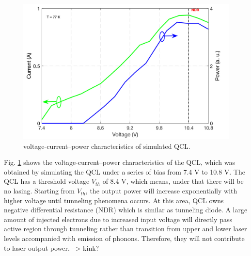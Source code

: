 \documentclass[11pt,final]{scrbook}
\begin{document}
\begin{figure}[htbp]
\begin{center}
\includegraphics[scale=0.6]{images/IVCURVE.pdf}
\caption{voltage-current–power characteristics of simulated QCL.}
\label{fig:IVcurve}
\end{center}
\end{figure}


Fig. \ref{fig:IVcurve} shows the voltage-current–power characteristics of the QCL, which was obtained by simulating the QCL under a series of bias from 7.4 V to 10.8 V. The QCL has a threshold voltage $V_{th}$ of 8.4 V, which means, under that there will be no lasing. Starting from $V_{th}$, the output power will increase exponentially with higher voltage until tunneling phenomena occurs. At this area, QCL owns negative differential resistance (NDR) which is similar as tunneling diode. A large amount of injected electrons due to increased input voltage will directly pass active region through tunneling rather than transition from upper and lower laser levels accompanied with emission of phonons. Therefore, they will not contribute to laser output power.
--> kink?
\end{document}
